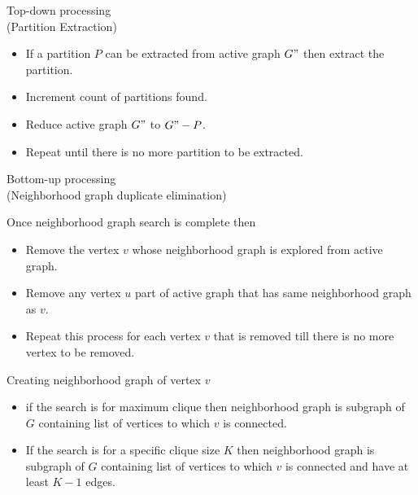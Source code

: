 \documentclass[landscape]{slides}
\begin{document}
\begin{slide}
	\begin{center}
	{\large{Top-down processing \\ (Partition Extraction)}}
	\end{center}

	\begin{itemize}
		\setlength{\itemsep}{0pt}
		\setlength{\parskip}{0pt}
		\setlength{\parsep}{0pt}
		\item If a partition {$P$} can be extracted from active graph {$G"$} then extract the partition.
		\item Increment count of partitions found.
		\item Reduce active graph {$G"$} to {$G" - P$}.
		\item Repeat until there is no more partition to be extracted. 
	\end{itemize}
\end{slide}

\begin{slide}
	\begin{center}
		{\large{Bottom-up processing \\ (Neighborhood graph duplicate elimination)}}
	\end{center}

	Once neighborhood graph search is complete then 
	\begin{itemize}
		\setlength{\itemsep}{0pt}
		\setlength{\parskip}{0pt}
		\setlength{\parsep}{0pt}
		\item Remove the vertex {$v$} whose neighborhood graph is explored from active graph.
		\item Remove any vertex {$u$} part of active graph that has same neighborhood graph as {$v$}.
		\item Repeat this process for each vertex {$v$} that is removed till there is no more vertex to be removed.
	\end{itemize}
\end{slide}

\begin{slide}
	\begin{center}
		{\large{Creating neighborhood graph of vertex {$v$}}}
	\end{center}

	\begin{itemize}
		\setlength{\itemsep}{0pt}
		\setlength{\parskip}{0pt}
		\setlength{\parsep}{0pt}
		\item if the search is for maximum clique then neighborhood graph is subgraph of {$G$} containing list of vertices to which {$v$} is connected.
		\item If the search is for a specific clique size {$K$} then neighborhood graph is subgraph of {$G$} containing list of vertices to which {$v$} is connected and have at least {$K - 1$} edges.
	\end{itemize}
\end{slide}
\end{document}
